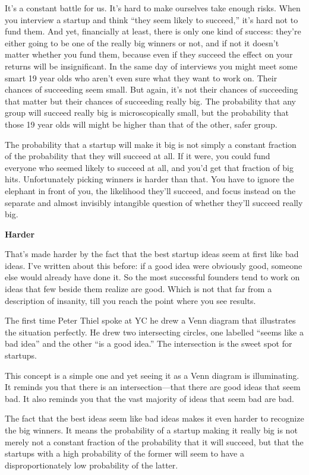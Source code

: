 \documentclass[12pt]{book}
\begin{document}
It's a constant battle for us. It's hard to make ourselves take enough
risks. When you interview a startup and think ``they seem likely to
succeed,'' it's hard not to fund them. And yet, financially at least,
there is only one kind of success: they're either going to be one of the
really big winners or not, and if not it doesn't matter whether you fund
them, because even if they succeed the effect on your returns will be
insignificant. In the same day of interviews you might meet some smart
19 year olds who aren't even sure what they want to work on. Their
chances of succeeding seem small. But again, it's not their chances of
succeeding that matter but their chances of succeeding really big. The
probability that any group will succeed really big is microscopically
small, but the probability that those 19 year olds will might be higher
than that of the other, safer group.

The probability that a startup will make it big is not simply a constant
fraction of the probability that they will succeed at all. If it were,
you could fund everyone who seemed likely to succeed at all, and you'd
get that fraction of big hits. Unfortunately picking winners is harder
than that. You have to ignore the elephant in front of you, the
likelihood they'll succeed, and focus instead on the separate and almost
invisibly intangible question of whether they'll succeed really big.

\textbf{Harder}

That's made harder by the fact that the best startup ideas seem at first
like bad ideas. I've written about this before: if a good idea were
obviously good, someone else would already have done it. So the most
successful founders tend to work on ideas that few beside them realize
are good. Which is not that far from a description of insanity, till you
reach the point where you see results.

The first time Peter Thiel spoke at YC he drew a Venn diagram that
illustrates the situation perfectly. He drew two intersecting circles,
one labelled ``seems like a bad idea'' and the other ``is a good idea.''
The intersection is the sweet spot for startups.

This concept is a simple one and yet seeing it as a Venn diagram is
illuminating. It reminds you that there is an intersection---that there
are good ideas that seem bad. It also reminds you that the vast majority
of ideas that seem bad are bad.

The fact that the best ideas seem like bad ideas makes it even harder to
recognize the big winners. It means the probability of a startup making
it really big is not merely not a constant fraction of the probability
that it will succeed, but that the startups with a high probability of
the former will seem to have a disproportionately low probability of the
latter.
\end{document}
